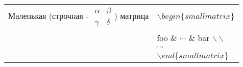 \documentclass[12pt]{article}
\begin{document}
\begin{center}
\begin{tabular}{ || l | l || }
    Маленькая (строчная - $
      \begin{smallmatrix}
        \alpha & \beta \\
        \gamma & \delta
      \end{smallmatrix}
    $) матрица &
    $\backslash begin\{smallmatrix\}$ \\ &
    foo \& $\cdots$ \& bar $\backslash\backslash$ \\ &
    $\cdots$ \\ &
    $\backslash end\{smallmatrix\}$ \\ \hline

  \end{tabular}
\end{center}
\end{document}
